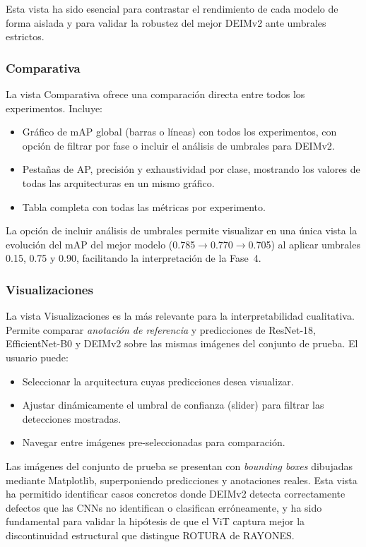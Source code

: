 Esta vista ha sido esencial para contrastar el rendimiento de cada modelo de forma aislada y para validar la robustez del mejor DEIMv2 ante umbrales estrictos.

\subsubsection{Comparativa}

La vista Comparativa ofrece una comparación directa entre todos los experimentos. Incluye:

\begin{itemize}
    \item Gráfico de mAP global (barras o líneas) con todos los experimentos, con opción de filtrar por fase o incluir el análisis de umbrales para DEIMv2.
    \item Pestañas de AP, precisión y exhaustividad por clase, mostrando los valores de todas las arquitecturas en un mismo gráfico.
    \item Tabla completa con todas las métricas por experimento.
\end{itemize}

La opción de incluir análisis de umbrales permite visualizar en una única vista la evolución del mAP del mejor modelo (0.785$\rightarrow$0.770$\rightarrow$0.705) al aplicar umbrales 0.15, 0.75 y 0.90, facilitando la interpretación de la Fase~4.

\subsubsection{Visualizaciones}

La vista Visualizaciones es la más relevante para la interpretabilidad cualitativa. Permite comparar \textit{anotación de referencia} y predicciones de ResNet-18, EfficientNet-B0 y DEIMv2 sobre las mismas imágenes del conjunto de prueba. El usuario puede:

\begin{itemize}
    \item Seleccionar la arquitectura cuyas predicciones desea visualizar.
    \item Ajustar dinámicamente el umbral de confianza (slider) para filtrar las detecciones mostradas.
    \item Navegar entre imágenes pre-seleccionadas para comparación.
\end{itemize}

Las imágenes del conjunto de prueba se presentan con \textit{bounding boxes} dibujadas mediante Matplotlib, superponiendo predicciones y anotaciones reales. Esta vista ha permitido identificar casos concretos donde DEIMv2 detecta correctamente defectos que las CNNs no identifican o clasifican erróneamente, y ha sido fundamental para validar la hipótesis de que el \acrshort{ViT} captura mejor la discontinuidad estructural que distingue ROTURA de RAYONES.

